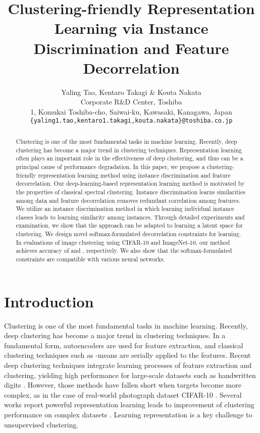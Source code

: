 \documentclass{article} \usepackage{iclr2021_conference,times}
\title{Clustering-friendly Representation Learning via Instance Discrimination and Feature Decorrelation}
\author{Yaling Tao, Kentaro Takagi \& Kouta Nakata \\
Corporate R\&D Center, Toshiba\\
1, Komukai Toshiba-cho, Saiwai-ku, Kawasaki, Kanagawa, Japan\\
\texttt{\{yaling1.tao,kentaro1.takagi,kouta.nakata\}@toshiba.co.jp}}
\begin{document}
\maketitle

\begin{abstract}
Clustering is one of the most fundamental tasks in machine learning. Recently, deep clustering has become a major trend in clustering techniques. Representation learning often plays an important role in the effectiveness of deep clustering, and thus can be a principal cause of performance degradation. In this paper, we propose a clustering-friendly representation learning method using instance discrimination and feature decorrelation. Our deep-learning-based representation learning method is motivated by the properties of classical spectral clustering. Instance discrimination learns similarities among data and feature decorrelation removes redundant correlation among features. We utilize an instance discrimination method in which learning individual instance classes leads to learning similarity among instances. Through detailed experiments and examination, we show that the approach can be adapted to learning a latent space for clustering. We design novel softmax-formulated decorrelation constraints for learning. In evaluations of image clustering using CIFAR-10 and ImageNet-10, our method achieves accuracy of  and , respectively. We also show that the softmax-formulated constraints are compatible with various neural networks.
\end{abstract}

\section{Introduction}



Clustering is one of the most fundamental tasks in machine learning. Recently, deep clustering has become a major trend in clustering techniques.
In a fundamental form, autoencoders are used for feature extraction, and classical clustering techniques such as -means are serially applied to the features.
Recent deep clustering techniques integrate learning processes of feature extraction and clustering, yielding high performance for large-scale datasets such as handwritten digits \cite{hu2017learning, shaham2018spectralnet, DEC, tao2018rdec}. However, those methods have fallen short when targets become more complex, as in the case of real-world photograph dataset CIFAR-10 \cite{krizhevsky2009learning}.
Several works report powerful representation learning leads to improvement of clustering performance on complex datasets \cite{DAC, DCCM}. Learning representation is a key challenge to unsupervised clustering.
\end{document}
